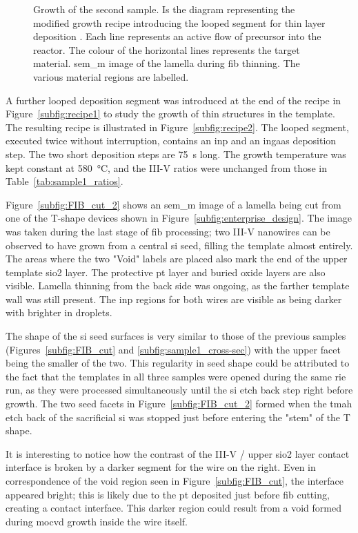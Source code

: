 \begin{figure}
{\begin{tikzpicture}
        \end{tikzpicture}
    }
    \caption[Growth recipe and \acs{sem_m}-\acs{fib} image of a cross-section of a wire from sample 2]{Growth of the second sample.  Is the diagram representing the modified growth recipe introducing the looped segment for thin layer deposition \cite{Brugnolotto2023}. Each line represents an active flow of precursor into the reactor. The colour of the horizontal lines represents the target material.  \acs{sem_m} image of the lamella during \acs{fib} thinning. The various material regions are labelled.}
    \label{fig:sample2_growth}
\end{figure}

A further looped deposition segment was introduced at the end of the recipe in Figure~\ref{subfig:recipe1} to study the growth of thin structures in the template. The resulting recipe is illustrated in Figure~\ref{subfig:recipe2}. The looped segment, executed twice without interruption, contains an \acs{inp} and an \acs{ingaas} deposition step. The two short deposition steps are \qty{75}{s} long. The growth temperature was kept constant at \qty{580}{\degreeCelsius}, and the III-V ratios were unchanged from those in Table~\ref{tab:sample1_ratios}.
\par
Figure~\ref{subfig:FIB_cut_2} shows an \acs{sem_m} image of a lamella being cut from one of the T-shape devices shown in Figure~\ref{subfig:enterprise_design}. The image was taken during the last stage of \acs{fib} processing; two III-V nanowires can be observed to have grown from a central \acl{si} seed, filling the template almost entirely. The areas where the two "Void" labels are placed also mark the end of the upper template \acs{sio2} layer. The protective \acl{pt} layer and buried oxide layers are also visible. Lamella thinning from the back side was ongoing, as the farther template wall was still present. The \acs{inp} regions for both wires are visible as being darker with brighter \acl{in} droplets.
\par
The shape of the \acl{si} seed surfaces is very similar to those of the previous samples (Figures~\ref{subfig:FIB_cut} and \ref{subfig:sample1_cross-sec}) with the upper  facet being the smaller of the two. This regularity in seed shape could be attributed to the fact that the templates in all three samples were opened during the same \acf{rie} run, as they were processed simultaneously until the \acl{si} etch back step right before growth. The two seed facets in Figure~\ref{subfig:FIB_cut_2} formed when the \acs{tmah} etch back of the sacrificial \acl{si} was stopped just before entering the "stem" of the T shape. 
\par
It is interesting to notice how the contrast of the III-V / upper \acs{sio2} layer contact interface is broken by a darker segment for the wire on the right. Even in correspondence of the void region seen in Figure~\ref{subfig:FIB_cut}, the interface appeared bright; this is likely due to the \acl{pt} deposited just before \acs{fib} cutting, creating a contact interface. This darker region could result from a void formed during \acs{mocvd} growth inside the wire itself.

